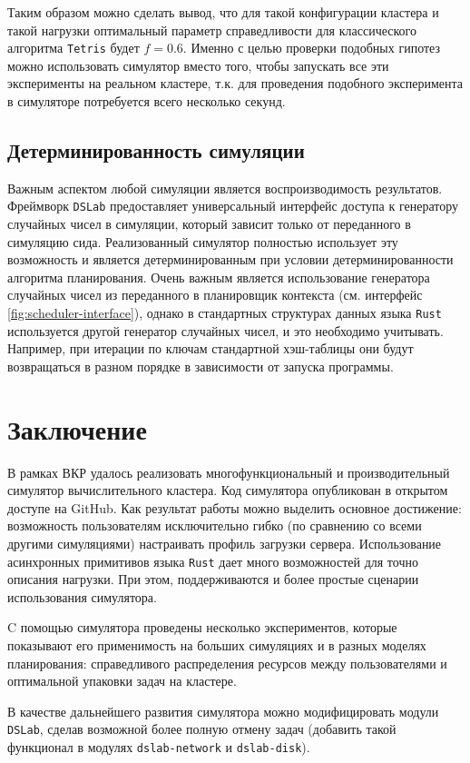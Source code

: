Таким образом можно сделать вывод, что для такой конфигурации кластера и такой нагрузки оптимальный параметр справедливости для классического алгоритма \texttt{Tetris} будет $f = 0.6$. Именно с целью проверки подобных гипотез можно использовать симулятор вместо того, чтобы запускать все эти эксперименты на реальном кластере, т.к. для проведения подобного эксперимента в симуляторе потребуется всего несколько секунд. 

\subsection{Детерминированность симуляции}

Важным аспектом любой симуляции является воспроизводимость результатов. Фреймворк \texttt{DSLab} предоставляет универсальный интерфейс доступа к генератору случайных чисел в симуляции, который зависит только от переданного в симуляцию сида. Реализованный симулятор полностью использует эту возможность и является детерминированным при условии детерминированности алгоритма планирования. Очень важным является использование генератора случайных чисел из переданного в планировщик контекста (см. интерфейс \ref{fig:scheduler-interface}), однако в стандартных структурах данных языка \texttt{Rust} используется другой генератор случайных чисел, и это необходимо учитывать. Например, при итерации по ключам стандартной хэш-таблицы они будут возвращаться в разном порядке в зависимости от запуска программы. 

\section{Заключение}\label{sec:conclusion}

В рамках ВКР удалось реализовать многофункциональный и производительный симулятор вычислительного кластера. Код симулятора опубликован в открытом доступе на GitHub\cite{dslab-cluster-scheduling-repo}. Как результат работы можно выделить основное достижение: возможность пользователям исключительно гибко (по сравнению со всеми другими симуляциями) настраивать профиль загрузки сервера. Использование асинхронных примитивов языка \texttt{Rust} дает много возможностей для точно описания нагрузки. При этом, поддерживаются и более простые сценарии использования симулятора. 

C помощью симулятора проведены несколько экспериментов, которые показывают его применимость на больших симуляциях и в разных моделях планирования: справедливого распределения ресурсов между пользователями и  оптимальной упаковки задач на кластере. 


В качестве дальнейшего развития симулятора можно модифицировать модули \texttt{DSLab}, сделав возможной более полную отмену задач (добавить такой функционал в модулях \texttt{dslab-network} и \texttt{dslab-disk}). 


